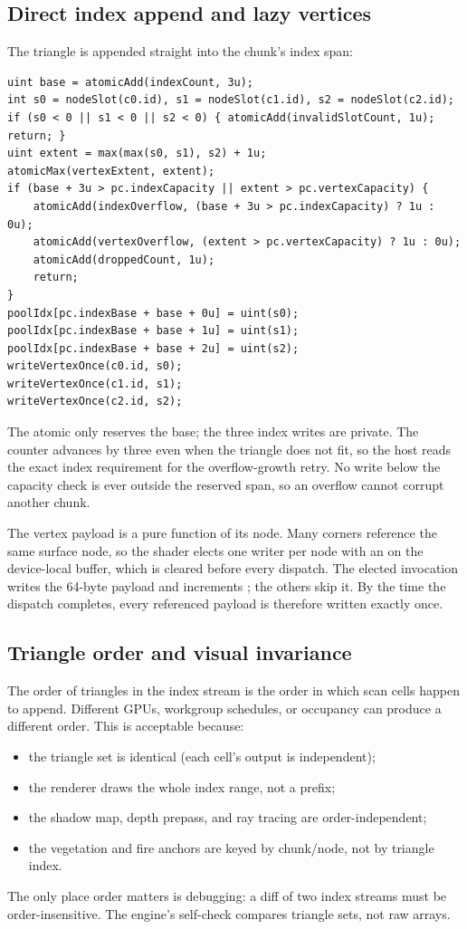 \subsection{Direct index append and lazy vertices}

The triangle is appended straight into the chunk's index span:
\begin{lstlisting}[style=glsl,caption={Index append.},label={lst:indexappend}]
uint base = atomicAdd(indexCount, 3u);
int s0 = nodeSlot(c0.id), s1 = nodeSlot(c1.id), s2 = nodeSlot(c2.id);
if (s0 < 0 || s1 < 0 || s2 < 0) { atomicAdd(invalidSlotCount, 1u); return; }
uint extent = max(max(s0, s1), s2) + 1u;
atomicMax(vertexExtent, extent);
if (base + 3u > pc.indexCapacity || extent > pc.vertexCapacity) {
    atomicAdd(indexOverflow, (base + 3u > pc.indexCapacity) ? 1u : 0u);
    atomicAdd(vertexOverflow, (extent > pc.vertexCapacity) ? 1u : 0u);
    atomicAdd(droppedCount, 1u);
    return;
}
poolIdx[pc.indexBase + base + 0u] = uint(s0);
poolIdx[pc.indexBase + base + 1u] = uint(s1);
poolIdx[pc.indexBase + base + 2u] = uint(s2);
writeVertexOnce(c0.id, s0);
writeVertexOnce(c1.id, s1);
writeVertexOnce(c2.id, s2);
\end{lstlisting}
The atomic only reserves the base; the three index writes are private.
The counter advances by three even when the triangle does not fit, so the
host reads the exact index requirement for the overflow-growth retry.  No
write below the capacity check is ever outside the reserved span, so an
overflow cannot corrupt another chunk.

The vertex payload is a pure function of its node.  Many corners reference
the same surface node, so the shader elects one writer per node with an
 on the device-local  buffer, which
is cleared before every dispatch.  The elected invocation writes the
64-byte payload and increments ; the others skip it.
By the time the dispatch completes, every referenced payload is therefore
written exactly once.

\subsection{Triangle order and visual invariance}

The order of triangles in the index stream is the order in which scan cells
happen to append.  Different GPUs, workgroup schedules, or occupancy can
produce a different order.  This is acceptable because:
\begin{itemize}
\item the triangle set is identical (each cell's output is independent);
\item the renderer draws the whole index range, not a prefix;
\item the shadow map, depth prepass, and ray tracing are order-independent;
\item the vegetation and fire anchors are keyed by chunk/node, not by
  triangle index.
\end{itemize}
The only place order matters is debugging: a diff of two index streams
must be order-insensitive.  The engine's self-check compares triangle sets,
not raw arrays.

